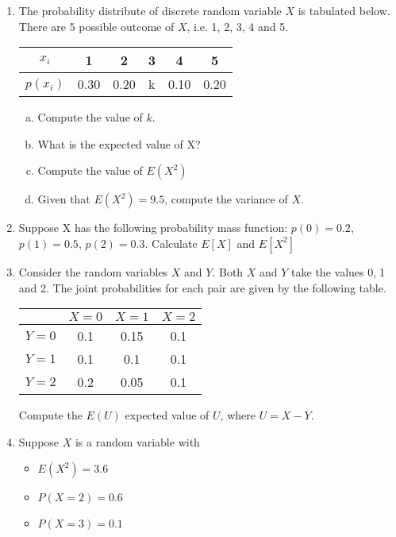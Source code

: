\documentclass[a4paper,12pt]{article}
\begin{document}
\begin{enumerate}
\begin{enumerate}[(a)]
	\item Compute the value for $k$.
	\item Determine the expected value $E(X)$.
	\item Evaluate $E(X^2)$.
	\item Compute the variance of random variable $X$.
\end{enumerate}[(a)]
\item The probability distribute of discrete random variable $X$ is tabulated below. There are 5 possible outcome of $X$, i.e. 1, 2, 3, 4 and 5.
\begin{center}
	\begin{tabular}{|c||c|c|c|c|c|}
		\hline
		$x_i$  & 1 & 2 & 3 & 4 & 5  \\\hline
		$p(x_i)$ & 0.30 & 0.20 & k & 0.10 & 0.20 \\
		\hline
	\end{tabular}
\end{center}

\begin{enumerate}[(a)]
	\item Compute the value of $k$.
	\item What is the expected value of X?
	\item Compute the value of $E(X^2)$
	\item Given that $E(X^2) = 9.5$, compute the variance of $X$.
\end{enumerate}
\item 
Suppose X has the following probability mass function: $p(0) =
0.2$, $p(1) = 0.5$, $p(2) = 0.3$. Calculate $E[X]$ and $E[X^2]$
\item Consider the random variables $X$ and $Y$. Both $X$ and $Y$ take the values 0,$\;$1 and 2. 
The joint probabilities for each pair are given by the following table.
\begin{center}
	\begin{tabular}{|c|c|c|c|}
		\hline  & $X=0$ & $X=1$ & $X=2$ \\ 
		\hline $Y=0$ & 0.1 & 0.15 & 0.1 \\ 
		\hline $Y=1$ & 0.1 & 0.1 & 0.1 \\ 
		\hline $Y=2$ & 0.2 & 0.05 & 0.1 \\ 
		\hline 
	\end{tabular} 
\end{center}
Compute the $E(U)$ expected value of $U$, where $U=X-Y$.
\item 
Suppose $X$ is a random variable with 
\begin{itemize}
	\item $E(X^2)=3.6$
	\item $P(X=2)=0.6$
	\item $P(X=3)=0.1$
\end{itemize}


\end{enumerate}
\end{document}
